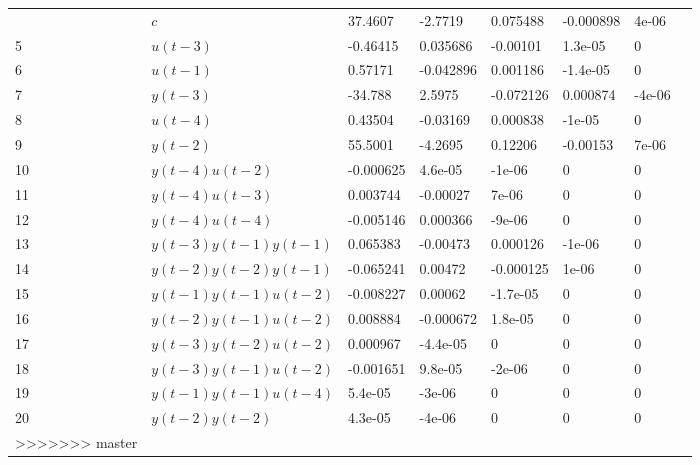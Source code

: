 \begin{tabular}{llllllll}
\begin{tabular}{lllllll}
4 & $c$ & 37.4607 & -2.7719 & 0.075488 & -0.000898 & 4e-06 \\ 
5 & $u(t-3)$ & -0.46415 & 0.035686 & -0.00101 & 1.3e-05 & 0 \\ 
6 & $u(t-1)$ & 0.57171 & -0.042896 & 0.001186 & -1.4e-05 & 0 \\ 
7 & $y(t-3)$ & -34.788 & 2.5975 & -0.072126 & 0.000874 & -4e-06 \\ 
8 & $u(t-4)$ & 0.43504 & -0.03169 & 0.000838 & -1e-05 & 0 \\ 
9 & $y(t-2)$ & 55.5001 & -4.2695 & 0.12206 & -0.00153 & 7e-06 \\ 
10 & $y(t-4)u(t-2)$ & -0.000625 & 4.6e-05 & -1e-06 & 0 & 0 \\ 
11 & $y(t-4)u(t-3)$ & 0.003744 & -0.00027 & 7e-06 & 0 & 0 \\ 
12 & $y(t-4)u(t-4)$ & -0.005146 & 0.000366 & -9e-06 & 0 & 0 \\ 
13 & $y(t-3)y(t-1)y(t-1)$ & 0.065383 & -0.00473 & 0.000126 & -1e-06 & 0 \\ 
14 & $y(t-2)y(t-2)y(t-1)$ & -0.065241 & 0.00472 & -0.000125 & 1e-06 & 0 \\ 
15 & $y(t-1)y(t-1)u(t-2)$ & -0.008227 & 0.00062 & -1.7e-05 & 0 & 0 \\ 
16 & $y(t-2)y(t-1)u(t-2)$ & 0.008884 & -0.000672 & 1.8e-05 & 0 & 0 \\ 
17 & $y(t-3)y(t-2)u(t-2)$ & 0.000967 & -4.4e-05 & 0 & 0 & 0 \\ 
18 & $y(t-3)y(t-1)u(t-2)$ & -0.001651 & 9.8e-05 & -2e-06 & 0 & 0 \\ 
19 & $y(t-1)y(t-1)u(t-4)$ & 5.4e-05 & -3e-06 & 0 & 0 & 0 \\ 
20 & $y(t-2)y(t-2)$ & 4.3e-05 & -4e-06 & 0 & 0 & 0 \\ 
>>>>>>> master
\hline 
\end{tabular}